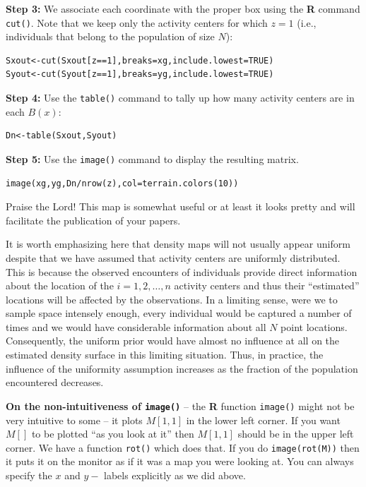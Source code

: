 {\flushleft \bf Step 3:} We associate each coordinate with the proper
box using the {\bf R} command \mbox{\tt cut()}. Note that we keep only
the activity centers for which $z=1$ (i.e., individuals that belong to
the population of size $N$):
\begin{verbatim}
Sxout<-cut(Sxout[z==1],breaks=xg,include.lowest=TRUE)
Syout<-cut(Syout[z==1],breaks=yg,include.lowest=TRUE)
\end{verbatim}

{\flushleft \bf Step 4:} Use the \mbox{\tt table()} command to tally
up how many activity centers are in each $B(x)$:
\begin{verbatim}
Dn<-table(Sxout,Syout)
\end{verbatim}

{\flushleft \bf Step 5:} Use the \mbox{\tt image()} command to display
the resulting matrix.
\begin{verbatim}
image(xg,yg,Dn/nrow(z),col=terrain.colors(10))
\end{verbatim}
Praise the Lord! This map is somewhat useful or at least it looks
pretty and will facilitate the publication of your papers.

It is worth emphasizing here that density maps will not usually appear
uniform despite that we have assumed that activity centers are
uniformly distributed. This is because the observed encounters of
individuals provide direct information about the location of the
$i=1,2,\ldots,n$ activity centers and thus their ``estimated'' locations
will be affected by the observations. In a limiting sense, were we to
sample space intensely enough, every individual would be captured a
number of times and we would have considerable information about all $N$
point locations. Consequently, the uniform prior would have almost no
influence at all on the estimated density surface in this limiting
situation. Thus, in practice, the influence of the uniformity
assumption increases as the fraction of the population encountered
decreases.

{\bf On the non-intuitiveness of \mbox{\tt image()} } -- the {\bf R}
function \mbox{\tt image()} might 
not be very intuitive to some -- it plots $M[1,1]$ in the lower left
corner. If you want $M[]$ to be plotted ``as
you look at it'' then $M[1,1]$ should be in the upper left corner.  We
have a function \mbox{\tt rot()} which does that. If you do \mbox{\tt image(rot(M))} then it
puts it on the monitor as if it was a map you were looking at.  You
can always specify the $x$ and $y-$ labels explicitly as we did above.

